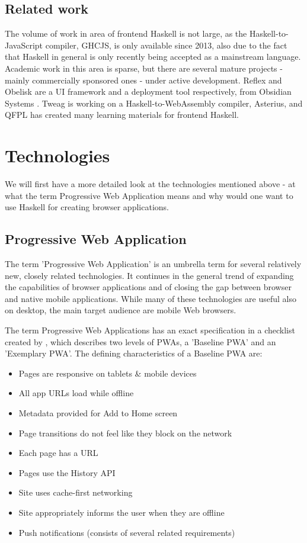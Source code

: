 \documentclass[english,odsaz]{fitthesis}
\begin{document}
\section{Related work}
\label{sec:orgf2ea405}
The volume of work in area of frontend Haskell is not large, as the
Haskell-to-JavaScript compiler, GHCJS, is only available since 2013, also due to
the fact that Haskell in general is only recently being accepted as a mainstream
language. Academic work in this area is sparse, but there are several mature
projects - mainly commercially sponsored ones - under active development. Reflex
and Obelisk are a UI framework and a deployment tool respectively, from Obsidian
Systems \cite{obsidian}. Tweag \cite{tweag} is working on a Haskell-to-WebAssembly
compiler, Asterius, and QFPL \cite{qfpl} has created many learning materials for
frontend Haskell.

\chapter{Technologies}
\label{sec:org4cdb8c0}
We will first have a more detailed look at the technologies mentioned above - at
what the term Progressive Web Application means and why would one want to use
Haskell for creating browser applications.

\section{Progressive Web Application}
\label{sec:org95559c6}
The term 'Progressive Web Application' is an umbrella term for several
relatively new, closely related technologies. It continues in the general trend
of expanding the capabilities of browser applications and of closing the gap
between browser and native mobile applications. While many of these technologies
are useful also on desktop, the main target audience are mobile Web browsers.

The term Progressive Web Applications has an exact specification in a checklist
created by \cite{pwa_checklist}, which describes two levels of PWAs, a 'Baseline
PWA' and an 'Exemplary PWA'. The defining characteristics of a Baseline PWA are:

\begin{itemize}
\item Pages are responsive on tablets \& mobile devices
\item All app URLs load while offline
\item Metadata provided for Add to Home screen
\item Page transitions do not feel like they block on the network
\item Each page has a URL
\item Pages use the History API
\item Site uses cache-first networking
\item Site appropriately informs the user when they are offline
\item Push notifications (consists of several related requirements)
\end{itemize}
\end{document}
